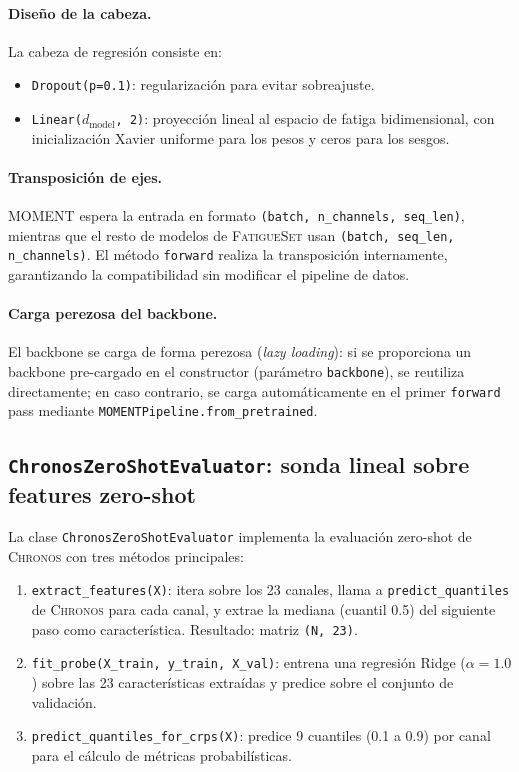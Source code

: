 \documentclass[12pt, a4paper]{article}
\newcommand{\code}[1]{\texttt{#1}}
\newcommand{\fatigueset}{\textsc{FatigueSet}}
\newcommand{\moment}{\textsc{MOMENT}}
\newcommand{\chronos}{\textsc{Chronos}}
\begin{document}
\paragraph{Diseño de la cabeza.} La cabeza de regresión consiste en:
\begin{itemize}
    \item \code{Dropout(p=0.1)}: regularización para evitar sobreajuste.
    \item \code{Linear($d_{\text{model}}$, 2)}: proyección lineal al espacio de fatiga bidimensional, con inicialización Xavier uniforme para los pesos y ceros para los sesgos.
\end{itemize}

\paragraph{Transposición de ejes.} \moment{} espera la entrada en formato \code{(batch, n\_channels, seq\_len)}, mientras que el resto de modelos de \fatigueset{} usan \code{(batch, seq\_len, n\_channels)}. El método \code{forward} realiza la transposición internamente, garantizando la compatibilidad sin modificar el pipeline de datos.

\paragraph{Carga perezosa del backbone.} El backbone se carga de forma perezosa (\textit{lazy loading}): si se proporciona un backbone pre-cargado en el constructor (parámetro \code{backbone}), se reutiliza directamente; en caso contrario, se carga automáticamente en el primer \code{forward} pass mediante \code{MOMENTPipeline.from\_pretrained}.


\subsection{\code{ChronosZeroShotEvaluator}: sonda lineal sobre features zero-shot}

La clase \code{ChronosZeroShotEvaluator} implementa la evaluación zero-shot de \chronos{} con tres métodos principales:

\begin{enumerate}
    \item \code{extract\_features(X)}: itera sobre los 23 canales, llama a \code{predict\_quantiles} de \chronos{} para cada canal, y extrae la mediana (cuantil 0.5) del siguiente paso como característica. Resultado: matriz \code{(N, 23)}.
    \item \code{fit\_probe(X\_train, y\_train, X\_val)}: entrena una regresión Ridge ($\alpha=1.0$) sobre las 23 características extraídas y predice sobre el conjunto de validación.
    \item \code{predict\_quantiles\_for\_crps(X)}: predice 9 cuantiles (0.1 a 0.9) por canal para el cálculo de métricas probabilísticas.
\end{enumerate}
\end{document}
